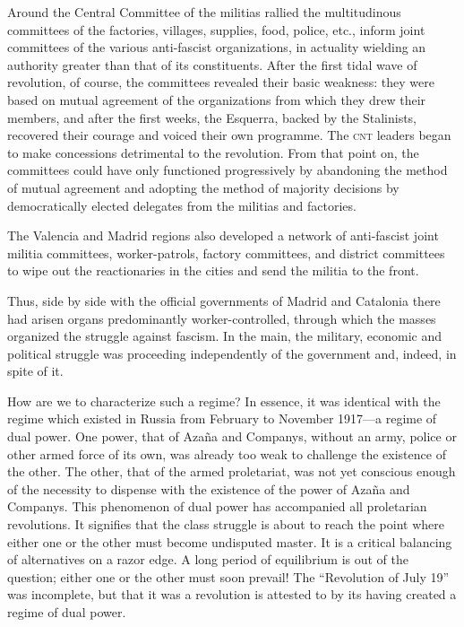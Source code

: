 Around the Central Committee of the militias rallied the multitudinous committees of the factories, villages, supplies, food, police, etc., inform joint committees of the various anti-fascist organizations, in actuality wielding an authority greater than that of its constituents. After the first tidal wave of revolution, of course, the committees revealed their basic weakness: they were based on mutual agreement of the organizations from which they drew their members, and after the first weeks, the Esquerra, backed by the Stalinists, recovered their courage and voiced their own programme. The \textsc{cnt} leaders began to make concessions detrimental to the revolution. From that point on, the committees could have only functioned progressively by abandoning the method of mutual agreement and adopting the method of majority decisions by democratically elected delegates from the militias and factories.

The Valencia and Madrid regions also developed a network of anti-fascist joint militia committees, worker-patrols, factory committees, and district committees to wipe out the reactionaries in the cities and send the militia to the front.
\nowidow

Thus, side by side with the official governments of Madrid and Catalonia there had arisen organs predominantly worker-controlled, through which the masses organized the struggle against fascism. In the main, the military, economic and political struggle was proceeding independently of the government and, indeed, in spite of it.

How are we to characterize such a regime? In essence, it was identical with the regime which existed in Russia from February to November 1917---a regime of dual power. One power, that of Azaña and Companys, without an army, police or other armed force of its own, was already too weak to challenge the existence of the other. The other, that of the armed proletariat, was not yet conscious enough of the necessity to dispense with the existence of the power of Azaña and Companys. This phenomenon of dual power has accompanied all proletarian revolutions. It signifies that the class struggle is about to reach the point where either one or the other must become undisputed master. It is a critical balancing of alternatives on a razor edge. A long period of equilibrium is out of the question; either one or the other must soon prevail! The ``Revolution of July 19'' was incomplete, but that it was a revolution is attested to by its having created a regime of dual power.